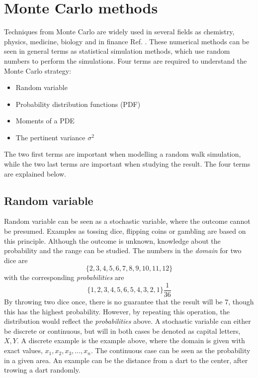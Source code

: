 \documentclass[%
twoside,                 %
final,                   %
chapterprefix=true,      %
open=right               %
10pt]{book}
\begin{document}
\section{Monte Carlo methods}
\label{sec:monte_carlo_methods}
Techniques from Monte Carlo are widely used in several fields as chemistry, physics, medicine, biology and in finance Ref. \cite{hjorth2011computational}. These numerical methods can be seen in general terms as statistical simulation methods, which use random numbers to perform the simulations. Four terms are required to understand the Monte Carlo strategy:
\begin{itemize}
\item Random variable

\item Probability distribution functions (PDF)

\item Moments of a PDE

\item The pertinent variance $\sigma ^2$
\end{itemize}

\noindent
The two first terms are important when modelling a random walk simulation, while the two last terms are important when studying the result. The four terms are explained below.

\subsection{Random variable}
Random variable can be seen as a stochastic variable, where the outcome cannot be presumed. Examples as tossing dice, flipping coins or gambling are based on this principle. Although the outcome is unknown, knowledge about the probability and the range can be studied. The numbers in the \emph{domain} for two dice are
\begin{equation*}
\{2,3,4,5,6,7,8,9,10,11,12\}
\end{equation*}
with the corresponding \emph{probabilities} are
\begin{equation*}
\{1,2,3,4,5,6,5,4,3,2,1\}\frac{1}{36}
\end{equation*}
By throwing two dice once, there is no guarantee that the result will be 7, though this has the highest probability. However, by repeating this operation, the distribution would reflect the \emph{probabilities} above. A stochastic variable can either be discrete or continuous, but will in both cases be denoted as capital letters, $X,Y$. A discrete example is the example above, where the domain is given with exact values, ${x_1,x_2,x_3,...,x_n}$. The continuous case can be seen as the probability in a given area. An example can be the distance from a dart to the center, after trowing a dart randomly.
\end{document}
